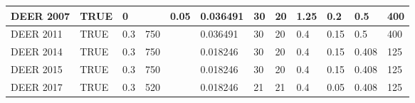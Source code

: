 \begin{table}
\begin{tabular}{|p{0.5in}|p{0.3in}|p{0.4in}|p{0.3in}|p{0.3in}|p{0.35in}|p{0.3in}|p{0.3in}|p{0.35in}|p{0.3in}|p{0.35in}|p{0.35in}|}
DEER 2007         & TRUE  & 0   &                         & 0.05   & 0.036491 & 30 & 20 & 1.25 & 0.2  & 0.5   & 400 \\ \hline
DEER 2011         & TRUE  & 0.3 & 750                     &        & 0.036491 & 30 & 20 & 0.4  & 0.15 & 0.5   & 400 \\ \hline
DEER 2014         & TRUE  & 0.3 & 750                     &        & 0.018246 & 30 & 20 & 0.4  & 0.15 & 0.408 & 125 \\ \hline
DEER 2015         & TRUE  & 0.3 & 750                     &        & 0.018246 & 30 & 20 & 0.4  & 0.15 & 0.408 & 125 \\ \hline
DEER 2017         & TRUE  & 0.3 & 520                     &        & 0.018246 & 21 & 21 & 0.4  & 0.05 & 0.408 & 125 \\ \hline
\end{tabular}
\end{table}